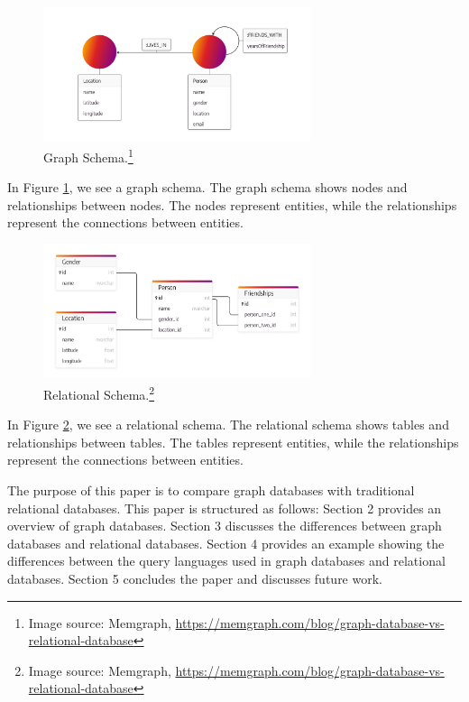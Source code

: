 \begin{figure}[ht]
    \centering
    \includegraphics[width=0.7\textwidth]{assets/memgraph-graph-schema.png}
    \caption{Graph Schema.\protect\footnote{Image source: Memgraph, \url{https://memgraph.com/blog/graph-database-vs-relational-database}}}
    \label{fig:graph_schema}
\end{figure}
In Figure \ref{fig:graph_schema}, we see a graph schema. The graph schema shows nodes and relationships between nodes. The nodes represent entities, while the relationships represent the connections between entities. 

\begin{figure}[ht]
    \centering
    \includegraphics[width=0.7\textwidth]{assets/memgraph-relational-schema.png}
    \caption{Relational Schema.\protect\footnote{Image source: Memgraph, \url{https://memgraph.com/blog/graph-database-vs-relational-database}}}
    \label{fig:relational_schema}
\end{figure}
In Figure \ref{fig:relational_schema}, we see a relational schema. The relational schema shows tables and relationships between tables. The tables represent entities, while the relationships represent the connections between entities.

The purpose of this paper is to compare graph databases with traditional relational databases. This paper is structured as follows: Section 2 provides an overview of graph databases. Section 3 discusses the differences between graph databases and relational databases. Section 4 provides an example showing the differences between the query languages used in graph databases and relational databases. Section 5 concludes the paper and discusses future work.